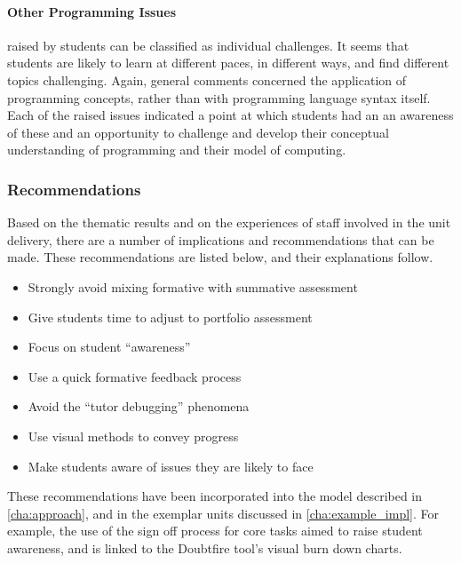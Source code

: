 
\paragraph{Other Programming Issues} %
\label{ssub:other_programming_issues}

raised by students can be classified as individual challenges. It seems that students are likely to learn at different paces, in different ways, and find different topics challenging. Again, general comments concerned the application of programming concepts, rather than with programming language syntax itself. Each of the raised issues indicated a point at which students had an an awareness of these and an opportunity to challenge and develop their conceptual understanding of programming and their model of computing. 


\subsubsection{Recommendations}
 
Based on the thematic results and on the experiences of staff involved in the unit delivery, there are a number of implications and recommendations that can be made. These recommendations are listed below, and their explanations follow.

\begin{itemize}[noitemsep,nolistsep]
	\item Strongly avoid mixing formative with summative assessment
	\item Give students time to adjust to portfolio assessment
	\item Focus on student ``awareness''
	\item Use a quick formative feedback process
	\item Avoid the ``tutor debugging'' phenomena
	\item Use visual methods to convey progress
	\item Make students aware of issues they are likely to face
\end{itemize}

These recommendations have been incorporated into the model described in \cref{cha:approach}, and in the exemplar units discussed in \cref{cha:example_impl}. For example, the use of the sign off process for core tasks aimed to raise student awareness, and is linked to the Doubtfire tool's visual burn down charts.

